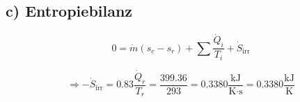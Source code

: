 \subsection*{c) Entropiebilanz}

\[
0 = \dot{m} \left( s_c - s_r \right) + \sum \frac{\dot{Q}_i}{T_i} + \dot{S}_{\text{irr}}
\]

\[
\Rightarrow -\dot{S}_{\text{irr}} = 0.83 \frac{\dot{Q}_r}{T_r} = \frac{399.36}{293} = 0.3380 \frac{\text{kJ}}{\text{K} \cdot \text{s}} = 0.3380 \frac{\text{kJ}}{\text{K}}
\]